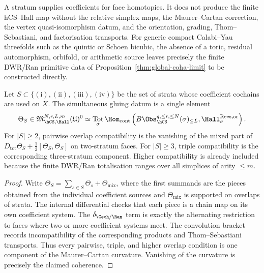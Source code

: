 \begin{remark}
\label{rem:part-a-scope}
A stratum supplies coefficients for face homotopies. It does not
produce the finite hCS--Hall map without the relative simplex maps,
the Maurer--Cartan correction, the vertex quasi-isomorphism datum, and
the orientation, grading, Thom--Sebastiani, and factorisation
transports. For generic compact Calabi--Yau threefolds such as the
quintic or Schoen bicubic, the absence of a toric, residual
automorphism, orbifold, or arithmetic source leaves precisely the
finite DWR/Ran primitive data of
Proposition~\ref{thm:global-coha-limit} to be constructed directly.
\end{remark}

\begin{proposition}
\label{prop:overlap-coherence}
Let $S\subset\{(\text{i}),(\text{ii}),(\text{iii}),(\text{iv})\}$ be
the set of strata whose coefficient cochains are used on $X$. The
simultaneous gluing datum is a single element
\[
 \Theta_S\in
 \mathfrak M_{\hCS,\Hall}^{N,r,L,m}(\mathfrak U)^0
 \simeq
 \operatorname*{Tot}_{\sigma}
 \Hom_{\mathrm{cont}}
 \left(B\Obs_{\hCS}^{q,\le r,\le N}(\sigma)_{\le L},
 \Hall_{\sigma}^{\mathrm{Rees},\mathrm{or}}\right).
\]
For $|S|\ge2$, pairwise overlap compatibility is the vanishing of the
mixed part of
$D_{\mathrm{tot}}\Theta_S+\frac12[\Theta_S,\Theta_S]$ on two-stratum
faces. For $|S|\ge3$, triple compatibility is the corresponding
three-stratum component. Higher compatibility is already included
because the finite DWR/Ran totalisation ranges over all simplices of
arity $\le m$.
\end{proposition}

\begin{proof}
Write $\Theta_S=\sum_{s\in S}\Theta_s+\Theta_{\mathrm{mix}}$, where
the first summands are the pieces obtained from the individual
coefficient sources and $\Theta_{\mathrm{mix}}$ is supported on
overlaps of strata. The internal differential checks that each piece is
a chain map on its own coefficient system. The
$\delta_{\Cech/\Ran}$ term is exactly the alternating restriction to
faces where two or more coefficient systems meet. The convolution
bracket records incompatibility of the corresponding products and
Thom--Sebastiani transports. Thus every pairwise, triple, and higher
overlap condition is one component of the Maurer--Cartan curvature.
Vanishing of the curvature is precisely the claimed coherence.
\end{proof}

